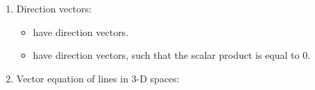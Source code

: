\documentclass[12pt, a4paper]{article}
\newtheorem{theorem}{Theorem}[subsection]
\def\d{{\mathrm{d}}}
\begin{document}
\begin{enumerate}
\begin{itemize}
    \begin{theorem}
    $$\vec{n}\cdot\left(\vec{p}-\vec{a}\right)=0\ \Rightarrow\ \vec{n}\cdot\vec{p}=\vec{n}\cdot\vec{a}.$$
    \end{theorem}
    \item If the direction vector $\vec{d}=\begin{pmatrix}d_1\\d_2\end{pmatrix}$, then one possible normal vector would be ${\color{red}{\vec{n}=\begin{pmatrix}d_2\\-d_1\end{pmatrix}}}$ or any other vectors parallel to it. 
    \item The vector form: 
    $$\begin{aligned}
      \color{red} \begin{pmatrix}x\\y\end{pmatrix}\cdot\begin{pmatrix}d_2\\-d_1\end{pmatrix}&\color{red}=\begin{pmatrix}x_1\\y_1\end{pmatrix}\cdot\begin{pmatrix}d_2\\-d_1\end{pmatrix}\\
      \color{green} \Rightarrow xd_2-yd_1&\color{green}=x_1d_2-y_1d_1\\
      \color{green}(x-x_1)d_2&\color{green}=yd_1-y_1d_1\\
      \color{red}\therefore y&\color{red}=\frac{d_2}{d_1}(x-x_1)+y_1.
    \end{aligned}$$
  \end{itemize}
  \item Direction vectors: 
  \begin{itemize}
    \item \textbf{\color{red}{Parallel lines}} have \textbf{\color{red}{collinear}} direction vectors. 
    \item \textbf{\color{red}{Perpendicular lines}} have \textbf{\color{red}{orthogonal}} direction vectors, such that the scalar product is equal to 0. 
  \end{itemize}
  \item Vector equation of lines in 3-D spaces: 
  \begin{itemize}

\end{itemize}
\end{enumerate}
\end{document}
